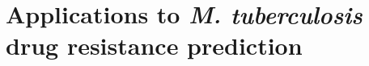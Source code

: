 \chapter{Applications to \textit{M. tuberculosis} drug resistance prediction}

\ifpdf
    \graphicspath{{Chapter3/Figs/Raster/}{Chapter3/Figs/PDF/}{Chapter3/Figs/}}
\else
    \graphicspath{{Chapter3/Figs/Vector/}{Chapter3/Figs/}}
\fi


